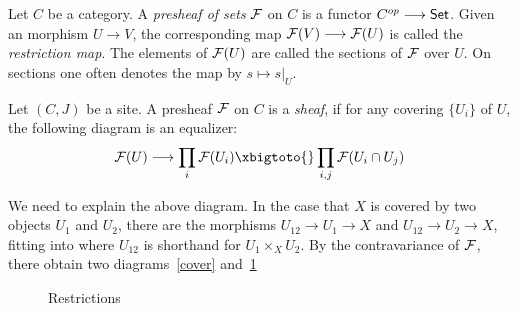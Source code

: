\begin{definition}[Presheaves] 
  Let $C$ be a category. A \textit{presheaf of sets} $\mathcal{F}$ on $C$ is a functor $C^{op} \longrightarrow \mathsf{Set}$. Given an morphism $U \to V$, the corresponding map $\mathcal{F}(V) \longrightarrow \mathcal{F}(U)$ is called the \textit{restriction map}. The elements of $\mathcal{F}(U)$ are called the sections of $\mathcal{F}$ over $U$. On sections one often denotes the map by $s \mapsto s|_U$.
\end{definition}

\begin{definition}[Sheaves]
  Let $(C,J)$ be a site.  A presheaf $\mathcal{F}$ on $C$ is a \textit{sheaf}, if for any covering $\{U_i\}$ of $U$, the following diagram is an equalizer:
  \begin{equation} \label{equalizer:1}
    \Sh{F}(U) \to \prod_{i} \Sh{F}(U_i) \xbigtoto{} \prod_{i,j} \Sh{F}(U_i \cap U_j)
  \end{equation}
\end{definition}

We need to explain the above diagram. In the case that $X$ is covered by two objects $U_1$ and $U_2$, there are the morphisms $U_{12} \to U_1 \to X$ and $U_{12} \to U_2 \to X$, fitting into  where $U_{12}$ is shorthand for $U_1 \times_X U_2$. By the contravariance of $\mathcal{F}$, there obtain two diagrams~\ref{cover} and~\ref{restriction}

\begin{figure}[h!]
    \tikzset{column sep=small, ampersand replacement=\&}
	\begin{floatrow}
    \centering

     {\caption{Restrictions}\label{restriction}}
    \end{floatrow}
    \tikzset{column sep=small, ampersand replacement=&}
\end{figure}

